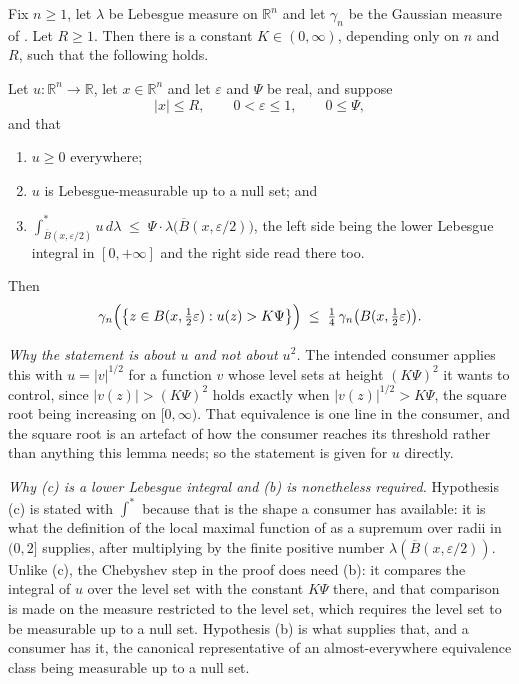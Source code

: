 \begin{lemma}
Fix $n \geq 1$, let $\lambda$ be Lebesgue measure on $\mathbb{R}^n$ and let
$\gamma_n$ be the Gaussian measure of .  Let $R \geq 1$.
Then there is a constant $K \in (0,\infty)$, depending only on $n$ and $R$,
such that the following holds.

Let $u : \mathbb{R}^n \to \mathbb{R}$, let $x \in \mathbb{R}^n$ and let
$\varepsilon$ and $\Psi$ be real, and suppose
\[
  |x| \leq R, \qquad 0 < \varepsilon \leq 1, \qquad 0 \leq \Psi ,
\]
and that
\begin{enumerate}
\item[(a)] $u \geq 0$ everywhere;
\item[(b)] $u$ is Lebesgue-measurable up to a null set; and
\item[(c)] $\displaystyle\int_{\overline B(x,\varepsilon/2)}^{*}u\,d\lambda
  \;\leq\; \Psi\cdot\lambda\bigl(\overline B(x,\varepsilon/2)\bigr)$, the left
  side being the lower Lebesgue integral in $[0,+\infty]$ and the right side
  read there too.
\end{enumerate}
Then
\[
  \gamma_n\Bigl(\bigl\{z \in B(x,\tfrac12\varepsilon) : u(z) > K\Psi\bigr\}\Bigr)
    \;\leq\; \tfrac14\,\gamma_n\bigl(B(x,\tfrac12\varepsilon)\bigr) .
\]

\emph{Why the statement is about $u$ and not about $u^2$.}  The intended
consumer applies this with $u = |v|^{1/2}$ for a function $v$ whose level sets
at height $(K\Psi)^2$ it wants to control, since $|v(z)| > (K\Psi)^2$ holds
exactly when $|v(z)|^{1/2} > K\Psi$, the square root being increasing on
$[0,\infty)$.  That equivalence is one line in the consumer, and the square
root is an artefact of how the consumer reaches its threshold rather than
anything this lemma needs; so the statement is given for $u$ directly.

\emph{Why (c) is a lower Lebesgue integral and (b) is nonetheless required.}
Hypothesis (c) is stated with $\int^{*}$ because that is the shape a consumer
has available: it is what the definition of the local maximal function of
 as a supremum over radii in $(0,2]$ supplies,
after multiplying by the finite positive number
$\lambda(\overline B(x,\varepsilon/2))$.  Unlike (c), the Chebyshev step in the
proof does need (b): it compares the integral of $u$ over the level set with
the constant $K\Psi$ there, and that comparison is made on the measure
restricted to the level set, which requires the level set to be measurable up
to a null set.  Hypothesis (b) is what supplies that, and a consumer has it,
the canonical representative of an almost-everywhere equivalence class being
measurable up to a null set.


\end{lemma}
